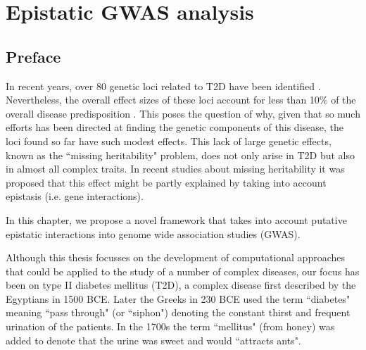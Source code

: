 
\chapter{Epistatic GWAS analysis\label{ch:gwas}}

\section{Preface}


In recent years, over 80 genetic loci related to T2D have been identified \cite{morris2012large, consortium2014genome}. Nevertheless, the overall effect sizes of these loci account for less than 10\% of the overall disease predisposition \cite{manolio2009finding}. This poses the question of why, given that so much efforts has been directed at finding the genetic components of this disease, the loci found so far have such modest effects. This lack of large genetic effects, known as the ``missing heritability" problem, does not only arise in T2D but also in almost all complex traits. In recent studies about missing heritability \cite{zuk2012mystery, zuk2014searching} it was proposed that this effect might be partly explained by taking into account epistasis (i.e. gene interactions).

In this chapter, we propose a novel framework that takes into account putative epistatic interactions into genome wide association studies (GWAS). 


Although this thesis focusses on the development of computational approaches that could be applied to the study of a number of complex diseases, our focus has been on type II diabetes mellitus (T2D), a complex disease first described by the Egyptians in 1500 BCE. Later the Greeks in 230 BCE used the term ``diabetes" meaning ``pass through" (or ``siphon") denoting the constant thirst and frequent urination of the patients. In the 1700s the term ``mellitus" (from honey) was added to denote that the urine was sweet and would ``attracts ants".

